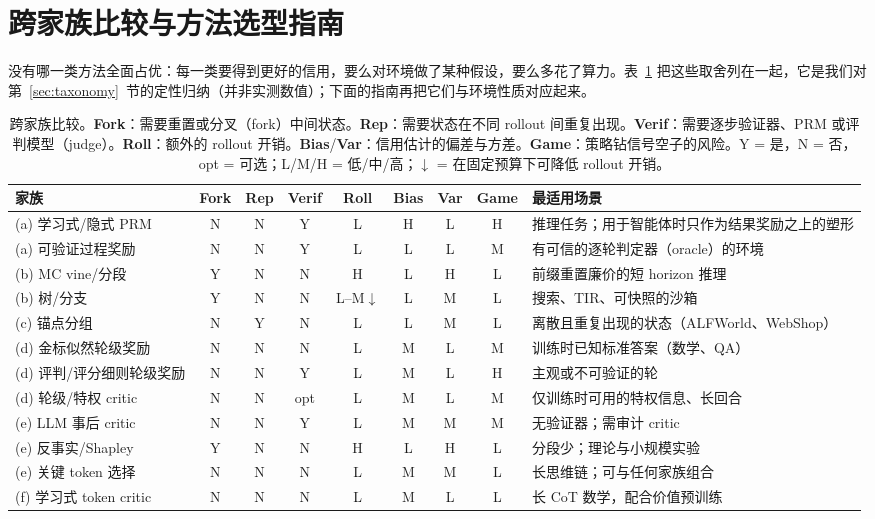 \section{跨家族比较与方法选型指南}\label{sec:comparison}

没有哪一类方法全面占优：每一类要得到更好的信用，要么对环境做了某种假设，要么多花了算力。表~\ref{tab:comparison} 把这些取舍列在一起，它是我们对第~\ref{sec:taxonomy}~节的定性归纳（并非实测数值）；下面的指南再把它们与环境性质对应起来。

\begin{table}[t]
\centering\small
\setlength{\tabcolsep}{2.5pt}
\caption{跨家族比较。\textbf{Fork}：需要重置或分叉（fork）中间状态。\textbf{Rep}：需要状态在不同 rollout 间重复出现。\textbf{Verif}：需要逐步验证器、PRM 或评判模型（judge）。\textbf{Roll}：额外的 rollout 开销。\textbf{Bias}/\textbf{Var}：信用估计的偏差与方差。\textbf{Game}：策略钻信号空子的风险。Y = 是，N = 否，opt = 可选；L/M/H = 低/中/高；${\downarrow}$ = 在固定预算下可降低 rollout 开销。}
\label{tab:comparison}
\begin{tabularx}{\textwidth}{@{}l c c c c c c c >{\raggedright\arraybackslash}X@{}}
\toprule
家族 & Fork & Rep & Verif & Roll & Bias & Var & Game & 最适用场景 \\
\midrule
(a) 学习式/隐式 PRM & N & N & Y & L & H & L & H & 推理任务；用于智能体时只作为结果奖励之上的塑形 \\
(a) 可验证过程奖励 & N & N & Y & L & L & L & M & 有可信的逐轮判定器（oracle）的环境 \\
(b) MC vine/分段 & Y & N & N & H & L & H & L & 前缀重置廉价的短 horizon 推理 \\
(b) 树/分支 & Y & N & N & L--M${\downarrow}$ & L & M & L & 搜索、TIR、可快照的沙箱 \\
(c) 锚点分组 & N & Y & N & L & L & M & L & 离散且重复出现的状态（ALFWorld、WebShop） \\
(d) 金标似然轮级奖励 & N & N & N & L & M & L & M & 训练时已知标准答案（数学、QA） \\
(d) 评判/评分细则轮级奖励 & N & N & Y & L & M & L & H & 主观或不可验证的轮 \\
(d) 轮级/特权 critic & N & N & opt & L & M & L & M & 仅训练时可用的特权信息、长回合 \\
(e) LLM 事后 critic & N & N & Y & L & M & M & M & 无验证器；需审计 critic \\
(e) 反事实/Shapley & Y & N & N & H & L & H & L & 分段少；理论与小规模实验 \\
(e) 关键 token 选择 & N & N & N & L & M & M & L & 长思维链；可与任何家族组合 \\
(f) 学习式 token critic & N & N & N & L & M & L & L & 长 CoT 数学，配合价值预训练 \\
\bottomrule
\end{tabularx}
\end{table}

